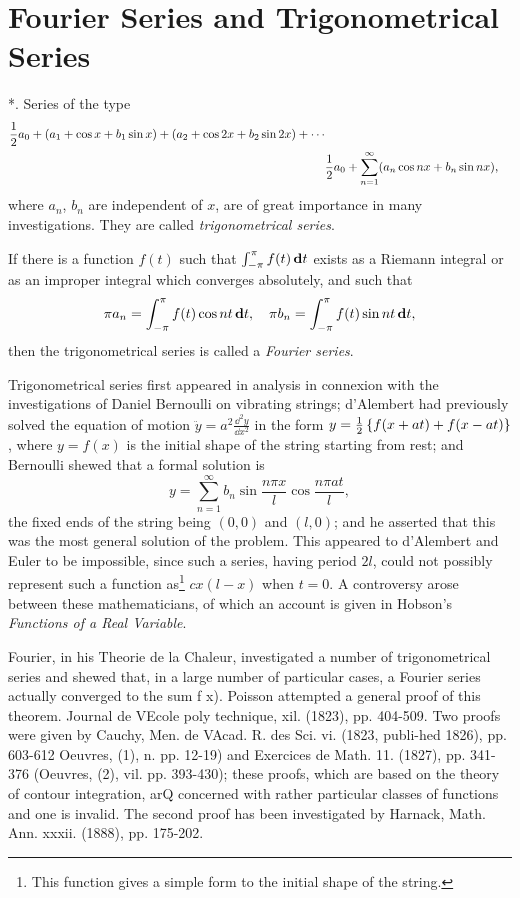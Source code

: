 %
%
\chapter{Fourier Series and Trigonometrical Series}
*. Series of the type
\begin{align*}
  \half a_{0}
  + (a_{1} + \cos x + b_{1} \sin x)
  + (a_{2} + \cos 2x + b_{2} \sin 2x)
  + \cdots
  \\
  &
  \hfill
  \half a_{0}
  +
  \sum_{n=1}^{\infty} ( a_{n} \cos nx + b_{n} \sin nx),
\end{align*}
where $a_{n}$, $b_{n}$ are independent of $x$, are of great importance in many
investigations. They are called \emph{trigonometrical series}.

If there is a function $f(t)$ such that
$\int_{-\pi}^{\pi} f(t) \, \mathbf{d} t$ exists as a Riemann
integral or as an improper integral which converges absolutely, and such that
$$
\pi a_{n} = \int_{-\pi}^{\pi} f(t) \cos nt \, \mathbf{d} t,
\quad
\pi b_{n} = \int_{-\pi}^{\pi} f(t) \sin nt \, \mathbf{d} t,
$$
then the trigonometrical series is called a \emph{Fourier series}.

Trigonometrical series first appeared in analysis in connexion with
the investigations of Daniel Bernoulli on vibrating strings;
d'Alembert had previously solved the equation of
motion
$ \ddot{y} = a^{2} \frac{\dd^{2} y}{\dd x^{2}}$
in the form
$y = \frac{1}{2} \left\{ f(x+at) + f(x-at) \right\}$, where $y=f(x)$ is
the initial shape of the string starting from rest;
and Bernoulli shewed that a formal solution is
$$
y
=
\sum_{n=1}^{\infty}
b_{n}
\sin \frac{n \pi x}{l}
\cos \frac{n \pi a t}{l},
$$
the fixed ends of the string being $(0,0)$ and $(l,0)$; and he asserted
that this was the most general solution of the problem. This appeared
to d'Alembert and Euler to be impossible, since such a series, having
period $2l$, could not possibly represent such a function
as\footnote{This function gives a simple form to the initial shape of the string.}
$c x (l-x)$ when $t = 0$.
A controversy arose between these mathematicians, of which
an account is given in Hobson's \emph{Functions of a Real Variable}.

Fourier, in his Theorie de la Chaleur, investigated a number of
trigonometrical series and shewed that, in a large number of
particular cases, a Fourier series actually converged to the sum f x).
Poisson attempted a general proof of this theorem. Journal de VEcole
poly technique, xil. (1823), pp. 404-509. Two proofs were given by
Cauchy, Men. de VAcad. R. des Sci. vi. (1823, publi-hed 1826), pp.
603-612 Oeuvres, (1), n. pp. 12-19) and Exercices de Math. 11. (1827),
pp. 341-376 (Oeuvres, (2), vil. pp. 393-430); these proofs, which are
based on the theory of contour integration, arQ concerned with rather
particular classes of functions and one is invalid. The second proof
has been investigated by Harnack, Math. Ann. xxxii. (1888), pp.
175-202.

